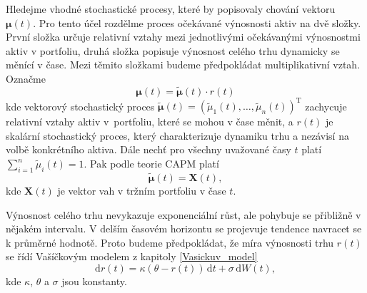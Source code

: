 \documentclass[a4paper,12pt]{report}
\theoremstyle{definition} \newtheorem{definice}[veta]{Definice}
\theoremstyle{remark}
\begin{document}


Hledejme vhodné stochastické procesy, které by popisovaly chování vektoru $\boldsymbol{\mu}(t)$.
Pro tento účel rozdělme proces očekávané výnosnosti aktiv na dvě složky.
První složka určuje relativní vztahy mezi jednotlivými očekávanými výnosnostmi aktiv v portfoliu, druhá složka popisuje výnosnost celého trhu dynamicky se měnící v čase.  
Mezi těmito složkami budeme předpokládat multiplikativní vztah.
Označme
\begin{equation} \label{vynos}
\boldsymbol{\mu}(t) =\tilde{\boldsymbol{\mu}}(t)\cdot r(t)
\end{equation}
kde
vektorový stochastický proces $\tilde{\boldsymbol{\mu}}(t)=(\tilde{\mu}_1(t),\dots,\tilde{\mu}_n(t))^\mathrm{T}$ zachycuje relativní vztahy aktiv v~portfoliu, které se mohou v čase měnit, a
$r(t)$ je skalární stochastický proces, který charakterizuje dynamiku trhu a nezávisí na volbě konkrétního aktiva.
Dále nechť pro všechny uvažované časy $t$ platí $\sum_{i=1}^n\tilde{\mu}_i(t)=1$.
Pak podle teorie CAPM platí 
\begin{equation} \label{vahy_mu}
\tilde{\boldsymbol{\mu}}(t)=\boldsymbol{X}(t),
\end{equation}
kde $\boldsymbol{X}(t)$ je vektor vah v tržním portfoliu v čase $t$.

Výnosnost celého trhu nevykazuje exponenciální růst, ale pohybuje se přibližně v nějakém intervalu. 
V delším časovém horizontu se projevuje tendence navracet se k průměrné hodnotě.
Proto budeme předpokládat, že míra výnosnosti trhu $r(t)$ se řídí Vašíčkovým modelem z kapitoly \ref{Vasickuv_model}
\begin{equation} 
\mathrm{d}r(t)=\kappa(\theta-r(t))\,\mathrm{d}t+\sigma\,\mathrm{d}W(t),
\end{equation}
kde $\kappa$, $\theta$ a $\sigma$ jsou konstanty.
\end{document}
